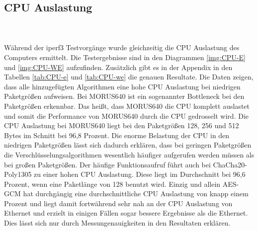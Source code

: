 \subsection{CPU Auslastung}
\\
\\
Während der iperf3 Testvorgänge wurde gleichzeitig die CPU Auslastung des Computers ermittelt. Die Testergebnisse sind in den Diagrammen \ref{img:CPU-E} und \ref{img:CPU-WE} aufzufinden. Zusätzlich gibt es in der Appendix in den Tabellen \ref{tab:CPU-e} und \ref{tab:CPU-we} die genauen Resultate. Die Daten zeigen, dass alle hinzugefügten Algorithmen eine hohe \gls{CPU} Auslastung bei niedrigen Paketgrößen aufweisen. Bei MORUS640 ist ein sogenannter Bottleneck bei den Paketgrößen erkennbar. Das heißt, dass MORUS640 die CPU komplett auslastet und somit die Performance von MORUS640 durch die CPU gedrosselt wird. Die \gls{CPU} Auslastung bei MORUS640 liegt bei den Paketgrößen 128, 256 und 512 Bytes im Schnitt bei 96,8 Prozent. Die enorme Belastung der CPU in den niedrigen Paketgrößen lässt sich dadurch erklären, dass bei geringen Paketgrößen die Verschlüsselungsalgorithmen wesentlich häufiger aufgerufen werden müssen als bei großen Paketgrößen. Der häufige Funktionsaufruf führt auch bei ChaCha20-Poly1305 zu einer hohen CPU Auslastung. Diese liegt im Durchschnitt bei 96,6 Prozent, wenn eine Paketlänge von 128 benutzt wird. Einzig und allein \gls{AES-GCM} hat durchgängig eine durchschnittliche CPU Auslastung von knapp einem Prozent und liegt damit fortwährend sehr nah an der CPU Auslastung von Ethernet und erzielt in einigen Fällen sogar bessere Ergebnisse als die Ethernet. Dies lässt sich nur durch Messungenauigkeiten in den Resultaten erklären.
